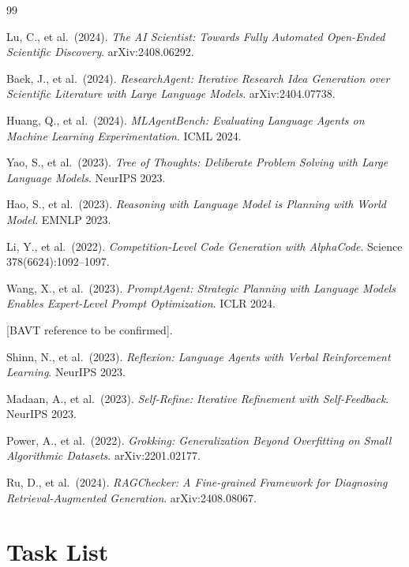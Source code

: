\documentclass{article}
\begin{document}

\begin{thebibliography}{99}

Lu, C., et al.\ (2024).
\emph{The AI Scientist: Towards Fully Automated Open-Ended Scientific Discovery}.
arXiv:2408.06292.

Baek, J., et al.\ (2024).
\emph{ResearchAgent: Iterative Research Idea Generation over Scientific Literature with Large Language Models}.
arXiv:2404.07738.

Huang, Q., et al.\ (2024).
\emph{MLAgentBench: Evaluating Language Agents on Machine Learning Experimentation}.
ICML 2024.

Yao, S., et al.\ (2023).
\emph{Tree of Thoughts: Deliberate Problem Solving with Large Language Models}.
NeurIPS 2023.

Hao, S., et al.\ (2023).
\emph{Reasoning with Language Model is Planning with World Model}.
EMNLP 2023.

Li, Y., et al.\ (2022).
\emph{Competition-Level Code Generation with AlphaCode}.
Science 378(6624):1092--1097.

Wang, X., et al.\ (2023).
\emph{PromptAgent: Strategic Planning with Language Models Enables Expert-Level Prompt Optimization}.
ICLR 2024.

[BAVT reference to be confirmed].

Shinn, N., et al.\ (2023).
\emph{Reflexion: Language Agents with Verbal Reinforcement Learning}.
NeurIPS 2023.

Madaan, A., et al.\ (2023).
\emph{Self-Refine: Iterative Refinement with Self-Feedback}.
NeurIPS 2023.

Power, A., et al.\ (2022).
\emph{Grokking: Generalization Beyond Overfitting on Small Algorithmic Datasets}.
arXiv:2201.02177.

Ru, D., et al.\ (2024).
\emph{RAGChecker: A Fine-grained Framework for Diagnosing Retrieval-Augmented Generation}.
arXiv:2408.08067.

\end{thebibliography}

\appendix

\section{Task List}
\label{app:tasks}
\end{document}
